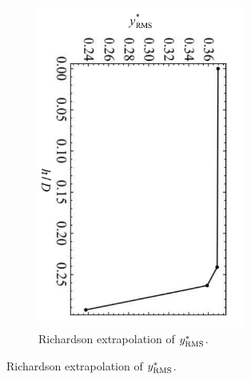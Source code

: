 \documentclass[oneside]{utmthesis}
\begin{document}
\begin{figure}
  \centering
  \begin{subfigure}[h]{1\textwidth}
    \hspace{1.9cm}
    \includegraphics[angle=90,width=0.75\textwidth,trim={0 0.3cm 0.5cm 0.2cm},clip]{figs/gciYrms-1a}
    \caption{Richardson extrapolation of $y^{*}_{\text{RMS}}$.}
    \label{fig:gciYrms-1}
  \end{subfigure}


\end{figure}
\end{document}
